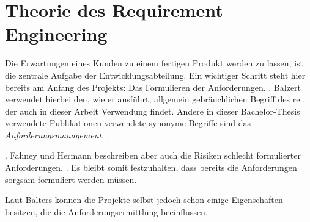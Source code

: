 \section{Theorie des Requirement Engineering}


Die Erwartungen eines Kunden zu einem fertigen Produkt werden zu lassen, ist die zentrale Aufgabe der Entwicklungsabteilung. Ein wichtiger Schritt steht hier bereits am Anfang des Projekts: Das Formulieren der Anforderungen.
 \citep[][434]{Balzert2010}. 
Balzert verwendet hierbei den, wie er ausführt, allgemein gebräuchlichen Begriff des \ac{re} \citep[vgl.][434]{Balzert2010}, der auch in dieser Arbeit Verwendung findet. Andere in dieser Bachelor-Thesis verwendete Publikationen verwendete synonyme Begriffe sind \zb das \textit{Anforderungsmanagement}.
 \citep[][6]{Grande2014}.

 \citep[Fahney und Hermann in][10]{Herrmann2013}.
Fahney und Hermann beschreiben aber auch die Risiken schlecht formulierter Anforderungen.  \citep[Fahney und Hermann in][10]{Herrmann2013}. 
Es bleibt somit festzuhalten, dass bereits die Anforderungen sorgsam formuliert werden müssen.

Laut Balters können die Projekte selbst jedoch schon einige Eigenschaften besitzen, die die Anforderungsermittlung beeinflussen. 

